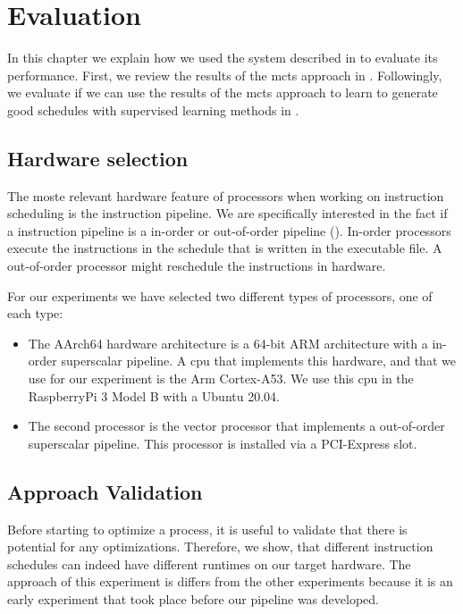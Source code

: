 \chapter{Evaluation}
In this chapter we explain how we used the system described in  to evaluate its performance.
First, we review the results of the \ac{mcts} approach in .
Followingly, we evaluate if we can use the results of the \ac{mcts} approach to learn to generate good schedules with supervised learning methods in .

\section{Hardware selection}
\label{sec:eval:hw}
The moste relevant hardware feature of processors when working on instruction scheduling is the instruction pipeline.
We are specifically interested in the fact if a instruction pipeline is a in-order or out-of-order pipeline ().
In-order processors execute the instructions in the schedule that is written in the executable file.
A out-of-order processor might reschedule the instructions in hardware.

For our experiments we have selected two different types of processors, one of each type:
\begin{itemize}
    \item 
    The AArch64 hardware architecture is a 64-bit ARM architecture with a in-order superscalar pipeline.
    A \ac{cpu} that implements this hardware, and that we use for our experiment is the Arm Cortex-A53.
    We use this \ac{cpu} in the RaspberryPi 3 Model B with a Ubuntu 20.04.
    
    \item
    The second processor is the \aurora vector processor that implements a out-of-order superscalar pipeline.
    This processor is installed via a PCI-Express slot.
\end{itemize}
    
\section{Approach Validation}
Before starting to optimize a process, it is useful to validate that there is potential for any optimizations.
Therefore, we show, that different instruction schedules can indeed have different runtimes on our target hardware.
The approach of this experiment is differs from the other experiments because it is an early experiment that took place before our pipeline was developed.


